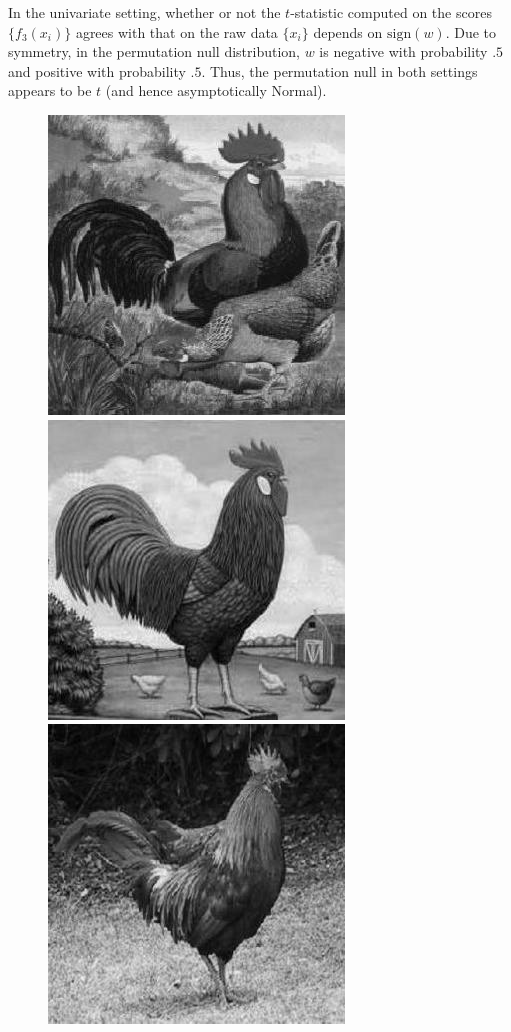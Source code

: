 In the univariate setting, whether or not the $t$-statistic computed
on the scores $\{f_3(x_i)\}$ agrees with that on the raw data
$\{x_i\}$ depends on $\text{sign}(w)$.  Due to symmetry, in the
permutation null distribution, $w$ is negative with probability $.5$
and positive with probability $.5$.  Thus, the permutation null in
both settings appears to be $t$ (and hence asymptotically Normal).

\begin{figure}
  \centering
      \includegraphics[scale=.2]{roosterrs-image_0001.jpg}
      \includegraphics[scale=.2]{roosterrs-image_0002.jpg}
      \includegraphics[scale=.2]{roosterrs-image_0003.jpg}

\end{figure}
